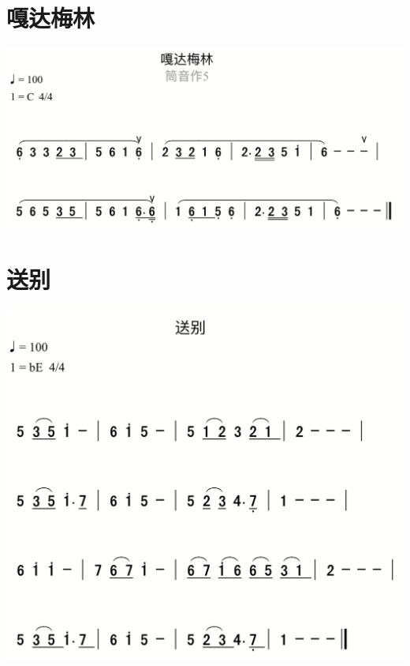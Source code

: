 \documentclass[cn,pad,chinese,chinesefont=nofont]{elegantbook}
\begin{document}
\section{嘎达梅林}
	\includegraphics[width=\textwidth]{dongxiao/IMG_0858-嘎达梅林.png}
\section{送别}
    \includegraphics[width=\textwidth]{dongxiao/IMG_0855-送别.png}  
\end{document}
